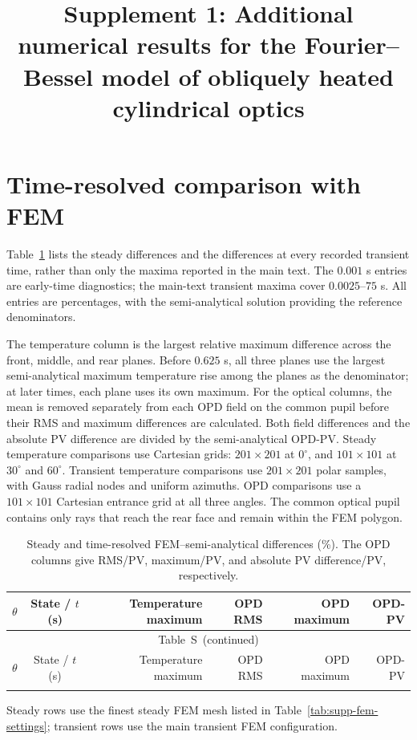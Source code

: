 \documentclass[9pt]{osa-supplemental-document}
\title{Supplement 1: Additional numerical results for the Fourier--Bessel model of obliquely heated cylindrical optics}
\author{} %
\date{}
\renewcommand{\thetable}{S\arabic{table}}
\begin{document}
\maketitle

\section{Time-resolved comparison with FEM}
Table~\ref{tab:supp-comparison} lists the steady differences and the differences at every recorded transient time, rather than only the maxima reported in the main text.
The $0.001$ s entries are early-time diagnostics; the main-text transient maxima cover $0.0025$--$75$ s.
All entries are percentages, with the semi-analytical solution providing the reference denominators.

The temperature column is the largest relative maximum difference across the front, middle, and rear planes.
Before $0.625$ s, all three planes use the largest semi-analytical maximum temperature rise among the planes as the denominator; at later times, each plane uses its own maximum.
For the optical columns, the mean is removed separately from each OPD field on the common pupil before their RMS and maximum differences are calculated.
Both field differences and the absolute PV difference are divided by the semi-analytical OPD-PV.
Steady temperature comparisons use Cartesian grids: $201\times201$ at $0^\circ$, and $101\times101$ at $30^\circ$ and $60^\circ$.
Transient temperature comparisons use $201\times201$ polar samples, with Gauss radial nodes and uniform azimuths.
OPD comparisons use a $101\times101$ Cartesian entrance grid at all three angles.
The common optical pupil contains only rays that reach the rear face and remain within the FEM polygon.

\begingroup\small
\begin{longtable}{ccrrrr}
\caption{Steady and time-resolved FEM--semi-analytical differences (\%). The OPD columns give RMS/PV, maximum/PV, and absolute PV difference/PV, respectively.}\label{tab:supp-comparison}\\
\toprule
$\theta$ & State / $t$ (s) & Temperature maximum & OPD RMS & OPD maximum & OPD-PV\\\midrule
\endfirsthead
\multicolumn{6}{c}{Table~\thetable\ (continued)}\\\toprule
$\theta$ & State / $t$ (s) & Temperature maximum & OPD RMS & OPD maximum & OPD-PV\\\midrule
\endhead
\bottomrule\endfoot

\end{longtable}
\endgroup
Steady rows use the finest steady FEM mesh listed in Table~\ref{tab:supp-fem-settings}; transient rows use the main transient FEM configuration.
\end{document}
